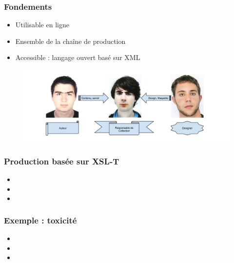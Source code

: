 \begin{frame}
	\frametitle{Fondements}
	\begin{itemize}
		\item Utilisable en ligne
		\item Ensemble de la chaîne de production
		\item Accessible : langage ouvert basé sur XML
	\end{itemize}
	\begin{figure}
		\centering
		\includegraphics[scale=0.2]{resources/lesBGdeLaDOC.png}
	\end{figure}
\end{frame}

\begin{frame}
	\frametitle{Production basée sur XSL-T}
	\begin{itemize}
		\item 
		\item 
		\item 
	\end{itemize}

\end{frame}

\begin{frame}
	\frametitle{Exemple : toxicité}
	\begin{itemize}
		\item 
		\item 
		\item 
	\end{itemize}

\end{frame}
